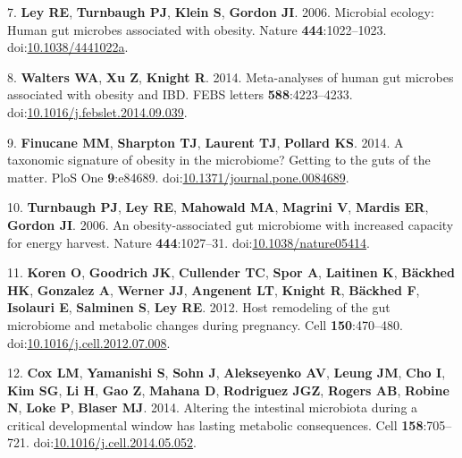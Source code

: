 \documentclass[12pt,]{article}
\begin{document}
\hypertarget{ref-leyux5fmicrobialux5f2006}{}
7. \textbf{Ley RE}, \textbf{Turnbaugh PJ}, \textbf{Klein S},
\textbf{Gordon JI}. 2006. Microbial ecology: Human gut microbes
associated with obesity. Nature \textbf{444}:1022--1023.
doi:\href{https://doi.org/10.1038/4441022a}{10.1038/4441022a}.

\hypertarget{ref-waltersux5fmeta-analysesux5f2014}{}
8. \textbf{Walters WA}, \textbf{Xu Z}, \textbf{Knight R}. 2014.
Meta-analyses of human gut microbes associated with obesity and IBD.
FEBS letters \textbf{588}:4223--4233.
doi:\href{https://doi.org/10.1016/j.febslet.2014.09.039}{10.1016/j.febslet.2014.09.039}.

\hypertarget{ref-finucaneux5ftaxonomicux5f2014}{}
9. \textbf{Finucane MM}, \textbf{Sharpton TJ}, \textbf{Laurent TJ},
\textbf{Pollard KS}. 2014. A taxonomic signature of obesity in the
microbiome? Getting to the guts of the matter. PloS One
\textbf{9}:e84689.
doi:\href{https://doi.org/10.1371/journal.pone.0084689}{10.1371/journal.pone.0084689}.

\hypertarget{ref-turnbaughux5fobesity-associatedux5f2006}{}
10. \textbf{Turnbaugh PJ}, \textbf{Ley RE}, \textbf{Mahowald MA},
\textbf{Magrini V}, \textbf{Mardis ER}, \textbf{Gordon JI}. 2006. An
obesity-associated gut microbiome with increased capacity for energy
harvest. Nature \textbf{444}:1027--31.
doi:\href{https://doi.org/10.1038/nature05414}{10.1038/nature05414}.

\hypertarget{ref-Koren2012}{}
11. \textbf{Koren O}, \textbf{Goodrich JK}, \textbf{Cullender TC},
\textbf{Spor A}, \textbf{Laitinen K}, \textbf{Bäckhed HK},
\textbf{Gonzalez A}, \textbf{Werner JJ}, \textbf{Angenent LT},
\textbf{Knight R}, \textbf{Bäckhed F}, \textbf{Isolauri E},
\textbf{Salminen S}, \textbf{Ley RE}. 2012. Host remodeling of the gut
microbiome and metabolic changes during pregnancy. Cell
\textbf{150}:470--480.
doi:\href{https://doi.org/10.1016/j.cell.2012.07.008}{10.1016/j.cell.2012.07.008}.

\hypertarget{ref-Cox2014}{}
12. \textbf{Cox LM}, \textbf{Yamanishi S}, \textbf{Sohn J},
\textbf{Alekseyenko AV}, \textbf{Leung JM}, \textbf{Cho I}, \textbf{Kim
SG}, \textbf{Li H}, \textbf{Gao Z}, \textbf{Mahana D}, \textbf{Rodriguez
JGZ}, \textbf{Rogers AB}, \textbf{Robine N}, \textbf{Loke P},
\textbf{Blaser MJ}. 2014. Altering the intestinal microbiota during a
critical developmental window has lasting metabolic consequences. Cell
\textbf{158}:705--721.
doi:\href{https://doi.org/10.1016/j.cell.2014.05.052}{10.1016/j.cell.2014.05.052}.
\end{document}
